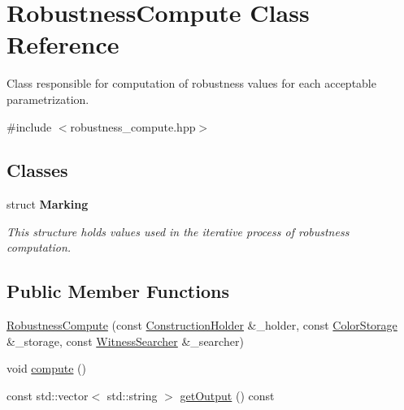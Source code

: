 \hypertarget{classRobustnessCompute}{\section{\-Robustness\-Compute \-Class \-Reference}
\label{classRobustnessCompute}
}


\-Class responsible for computation of robustness values for each acceptable parametrization.  




{\ttfamily \#include $<$robustness\-\_\-compute.\-hpp$>$}

\subsection*{\-Classes}
\begin{DoxyCompactItemize}
\item 
struct {\bfseries \-Marking}
\begin{DoxyCompactList}\small\item\em \-This structure holds values used in the iterative process of robustness computation. \end{DoxyCompactList}\end{DoxyCompactItemize}
\subsection*{\-Public \-Member \-Functions}
\begin{DoxyCompactItemize}
\item 
\hyperlink{classRobustnessCompute_a993dbf286ff8bfc10ea258a9f72ce367}{\-Robustness\-Compute} (const \hyperlink{classConstructionHolder}{\-Construction\-Holder} \&\-\_\-holder, const \hyperlink{classColorStorage}{\-Color\-Storage} \&\-\_\-storage, const \hyperlink{classWitnessSearcher}{\-Witness\-Searcher} \&\-\_\-searcher)
\item 
void \hyperlink{classRobustnessCompute_a41558aefef39b75773596ae909c6ba81}{compute} ()
\item 
const std\-::vector$<$ std\-::string $>$ \hyperlink{classRobustnessCompute_a4d84d96e7aeb88c9153a4b6fca767902}{get\-Output} () const 
\end{DoxyCompactItemize}


